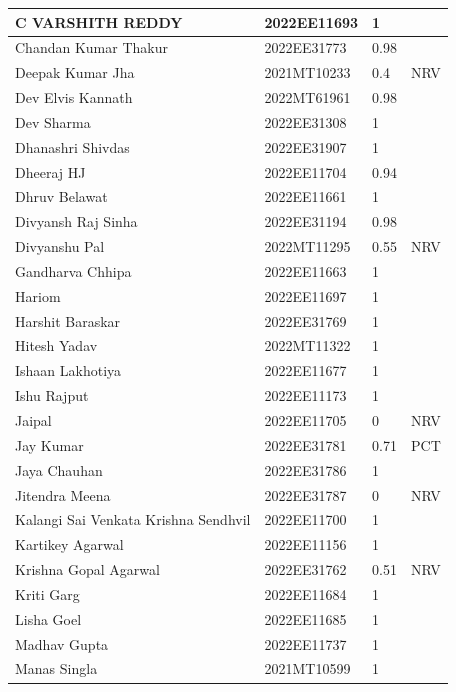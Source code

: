 \documentclass[12pt,a4paper]{article}
\begin{document}
\begin{longtable}{|l|l|l|l|}
        C VARSHITH REDDY & 2022EE11693 & 1 & ~ \\ \hline
        Chandan Kumar Thakur & 2022EE31773 & 0.98 & ~ \\ \hline
        Deepak Kumar Jha & 2021MT10233 & 0.4 & NRV \\ \hline
        Dev Elvis Kannath & 2022MT61961 & 0.98 & ~ \\ \hline
        Dev Sharma & 2022EE31308 & 1 & ~ \\ \hline
        Dhanashri Shivdas & 2022EE31907 & 1 & ~ \\ \hline
        Dheeraj HJ & 2022EE11704 & 0.94 & ~ \\ \hline
        Dhruv Belawat & 2022EE11661 & 1 & ~ \\ \hline
        Divyansh Raj Sinha & 2022EE31194 & 0.98 & ~ \\ \hline
        Divyanshu Pal & 2022MT11295 & 0.55 & NRV \\ \hline
        Gandharva Chhipa & 2022EE11663 & 1 & ~ \\ \hline
        Hariom & 2022EE11697 & 1 & ~ \\ \hline
        Harshit Baraskar & 2022EE31769 & 1 & ~ \\ \hline
        Hitesh Yadav & 2022MT11322 & 1 & ~ \\ \hline
        Ishaan Lakhotiya & 2022EE11677 & 1 & ~ \\ \hline
        Ishu Rajput & 2022EE11173 & 1 & ~ \\ \hline
        Jaipal & 2022EE11705 & 0 & NRV \\ \hline
        Jay Kumar & 2022EE31781 & 0.71 & PCT \\ \hline
        Jaya Chauhan & 2022EE31786 & 1 & ~ \\ \hline
        Jitendra Meena & 2022EE31787 & 0 & NRV \\ \hline
        Kalangi Sai Venkata Krishna Sendhvil & 2022EE11700 & 1 & ~ \\ \hline
        Kartikey Agarwal & 2022EE11156 & 1 & ~ \\ \hline
        Krishna Gopal Agarwal & 2022EE31762 & 0.51 & NRV \\ \hline
        Kriti Garg & 2022EE11684 & 1 & ~ \\ \hline
        Lisha Goel & 2022EE11685 & 1 & ~ \\ \hline
        Madhav Gupta & 2022EE11737 & 1 & ~ \\ \hline
        Manas Singla & 2021MT10599 & 1 & ~ \\ \hline

\end{longtable}
\end{document}
